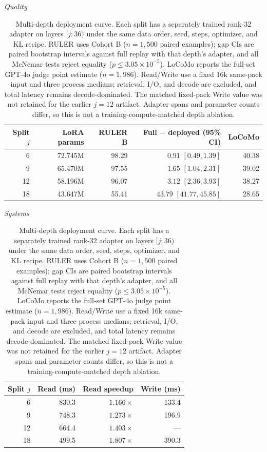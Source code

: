 \begin{table}[!htbp]
\centering
\small
\setlength{\tabcolsep}{5pt}
\textit{Quality}\par\vspace{2pt}
\begin{tabular}{@{}rrrrr@{}}
\toprule
\textbf{Split $j$} & \textbf{LoRA params} & \textbf{RULER B} & \textbf{Full $-$ deployed (95\% CI)} & \textbf{LoCoMo} \\
\midrule
6  & 72.745M & 98.29 & $0.91$ $[0.49,1.39]$ & 40.38 \\
9  & 65.470M & 97.55 & $1.65$ $[1.04,2.31]$ & 39.02 \\
12 & 58.196M & 96.07 & $3.12$ $[2.36,3.93]$ & 38.27 \\
18 & 43.647M & 55.41 & $43.79$ $[41.77,45.85]$ & 28.65 \\
\bottomrule
\end{tabular}

\vspace{5pt}
\textit{Systems}\par\vspace{2pt}
\begin{tabular}{@{}rrrr@{}}
\toprule
\textbf{Split $j$} & \textbf{Read (ms)} & \textbf{Read speedup} & \textbf{Write (ms)} \\
\midrule
6  & 830.3 & $1.166\times$ & 133.4 \\
9  & 748.3 & $1.273\times$ & 196.9 \\
12 & 664.4 & $1.403\times$ & --- \\
18 & 499.5 & $1.807\times$ & 390.3 \\
\bottomrule
\end{tabular}
\caption{Multi-depth deployment curve. Each split has a separately trained rank-32
adapter on layers $[j{:}36)$ under the same data order, seed, steps, optimizer,
and KL recipe. RULER uses Cohort B ($n{=}1{,}500$ paired examples); gap CIs are
paired bootstrap intervals against full replay with that depth's adapter, and
all McNemar tests reject equality ($p\leq3.05\times10^{-5}$). LoCoMo reports the
full-set GPT-4o judge point estimate ($n{=}1{,}986$). Read/Write use a fixed 16k
same-pack input and three process medians; retrieval, I/O, and decode are
excluded, and total latency remains decode-dominated. The matched fixed-pack
Write value was not retained for the earlier $j{=}12$ artifact. Adapter spans
and parameter counts differ, so this is not a training-compute-matched depth
ablation.}
\label{tab:distilled-depth-curve}
\end{table}
